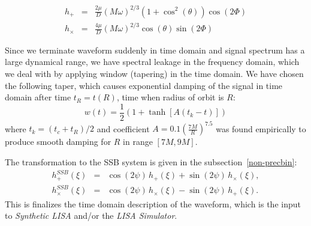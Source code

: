 \documentclass[11pt]{report}
\def\be{\begin{equation}}
\def\bea{\begin{eqnarray}}
\def\en{\end{equation}}
\def\ena{\end{eqnarray}}
\def\bL{{\bf \hat{L}_{N}}}
\begin{document}
\bea
h_{+} &=& \frac{2\mu}{D}(M\omega)^{2/3}(1+\cos^2(\theta))\cos(2\Phi)
\label{hp}\\
h_{\times} &=& \frac{4\mu}{D}(M\omega)^{2/3}\cos(\theta)\sin(2\Phi)
\label{hc}
\ena

Since we terminate waveform suddenly in time domain and signal spectrum has a large dynamical range, we have spectral leakage in the 
frequency domain, which we deal with by applying window
(tapering) in the time domain. We have chosen the following taper,
which causes exponential damping of the signal in time domain 
after time $t_R = t(R)$, time when radius of orbit is $R$:
\be
w(t) = \frac1{2}\left( 1 + \tanh\left[A(t_{k} - t)\right]  \right)
\en
where $t_k = (t_c + t_R)/2$ and coefficient $A = 0.1\left(\frac{7M}{R}
\right)^{7.5}$ was found empirically to produce smooth damping 
for $R$ in range $[7M, 9M]$.


The transformation to the SSB system is given in the subsection~\ref{non-precbin}:
\bea
h_{+}^{SSB}(\xi) &=& \cos (2\psi) \, h_+(\xi)  + \sin (2 \psi) \, h_\times(\xi), \label{hps}\\
h_\times^{SSB}(\xi) &=& \cos (2\psi) \, h_\times(\xi)  - \sin (2 \psi) \, h_+(\xi).\label{hcs}
\ena
 This is finalizes the time domain description of the 
waveform, which is the input to {\it Synthetic LISA} and/or the {\it LISA Simulator}.





\end{document}

